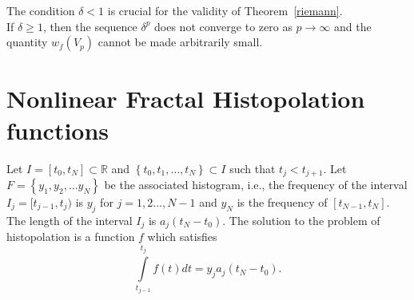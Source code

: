 \documentclass[sn-mathphys-num]{sn-jnl}
\numberwithin{equation}{section}
\begin{document}
\begin{remark}The condition $\delta < 1$ is crucial for the validity of Theorem~\ref{riemann}.\\ If $\delta \geq 1$, then the sequence $\delta^p$ does not converge to zero as $p \to \infty$ and the quantity $w_f(V_p)$ cannot be made arbitrarily small. 
\end{remark}
\section{Nonlinear Fractal Histopolation functions}\label{NFHfunctions}
Let $I=[t_0,t_N]\subset\mathbb{R}$ and $\left\{t_0,t_1,\dots, t_N\right\}\subset I$ such that $t_j<t_{j+1}$. Let $F=\left\{y_1,y_2,\dots y_N\right\}$ be the associated histogram, i.e., the frequency of the interval $I_j=[t_{j-1},t_j)$ is $y_j$ for $j=1,2\ldots, N-1$ and $y_N$ is the frequency of $[t_{N-1},t_N]$. The length of the interval $I_j$ is $a_j(t_N-t_0)$. The solution to the problem of histopolation is a function $f$ which satisfies
\begin{equation}
\int\limits_{t_{j-1}}^{t_j} f(t)dt=y_ja_j(t_N-t_0).\label{hdef}
\end{equation}
\end{document}
